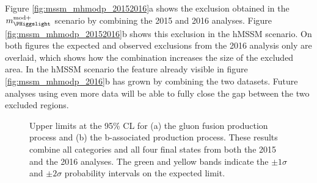 Figure \ref{fig:mssm_mhmodp_20152016}a shows the exclusion obtained in the $m_{\PHiggslight}^{\text{mod+}}$ 
scenario by combining the 2015 and 2016 analyses. Figure \ref{fig:mssm_mhmodp_20152016}b shows this exclusion
in the hMSSM scenario. On both figures the expected and observed exclusions from the
2016 analysis only are overlaid, which shows how the combination increases the
size of the excluded area. In the hMSSM scenario the feature already visible in figure \ref{fig:mssm_mhmodp_2016}b
has grown by combining the two datasets. Future analyses using even more data will be able to fully close
the gap between the two excluded regions.
\begin{figure}[h!]
\begin{center}
\end{center}
\caption[Upper limits at the 95\% CL for the gluon fusion and b-associated production
process, obtained by combining all channels and categories of the 2015 and the 2016 analyses.]{Upper limits at the 95\% \ac{CL} for (a) the gluon fusion production
process and (b) the b-associated production process. These results
combine all categories and all four final states from both the 2015
and the 2016 analyses. The green and yellow bands indicate
the $\pm 1\sigma$ and $\pm 2\sigma$ probability intervals on the expected limit.}
\label{fig:mssm_results_combination_limits}
\end{figure}
